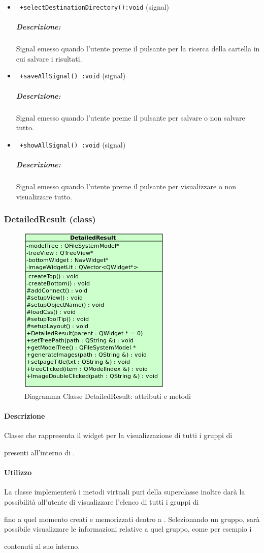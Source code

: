 \begin{itemize}
\item\color{blue}\verb! +selectDestinationDirectory():void! (signal)
\color{black} 
\subparagraph{Descrizione:}
Signal\g{} emesso quando l'utente preme il pulsante per la ricerca della cartella in cui salvare i risultati.

\item\color{blue}\verb! +saveAllSignal() :void! (signal)
\color{black} 
\subparagraph{Descrizione:}
Signal\g{} emesso quando l'utente preme il pulsante per salvare o non salvare tutto.

\item\color{blue}\verb! +showAllSignal() :void! (signal)
\color{black} 
\subparagraph{Descrizione:}
Signal\g{} emesso quando l'utente preme il pulsante per visualizzare o non visualizzare tutto.
\end{itemize}
\pagebreak
\color{black}
\subsubsection{DetailedResult (class)}
\label{spedetRe}
\begin{figure}[!h]
\centering
			\includegraphics[width=0.5\linewidth]{./Content/Immagini/view/DetailedResult.png}
			\caption{Diagramma Classe DetailedResult: attributi e metodi}
			\label{cl_detRes}
\end{figure}
\paragraph{Descrizione \\}
Classe che rappresenta il widget per la visualizzazione di tutti i gruppi di \subject{} presenti all'interno di \project.
\paragraph{Utilizzo\\}
La classe implementerà i metodi virtuali puri della superclasse inoltre darà la possibilità all'utente di visualizzare l'elenco di tutti i gruppi di \subject{} fino a quel momento creati e memorizzati dentro a \project. Selezionando un gruppo, sarà possibile visualizzare le informazioni relative a quel gruppo, come per esempio i \subject{} contenuti al suo interno.
